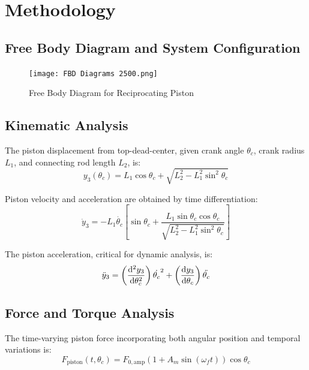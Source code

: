 \documentclass[10pt]{article}
\begin{document}
\section{Methodology}

\subsection{Free Body Diagram and System Configuration}

\begin{figure}[H]
    \centering
    \texttt{[image: FBD Diagrams 2500.png]}
    \caption{Free Body Diagram for Reciprocating Piston}
\end{figure}

\subsection{Kinematic Analysis}

The piston displacement from top-dead-center, given crank angle \(\theta_c\), crank radius \(L_1\), and connecting rod length \(L_2\), is:
\begin{equation}
    y_3(\theta_c) = L_1 \cos\theta_c + \sqrt{L_2^2 - L_1^2 \sin^2\theta_c}
\end{equation}

Piston velocity and acceleration are obtained by time differentiation:
\begin{equation}
    \dot{y}_3 = -L_1 \dot{\theta_c} \left[ \sin\theta_c + \frac{L_1 \sin\theta_c \cos\theta_c}{\sqrt{L_2^2 - L_1^2 \sin^2\theta_c}} \right]
\end{equation}

The piston acceleration, critical for dynamic analysis, is:
\begin{equation}
    \ddot{y}_3 = \left( \dv[2]{y_3}{\theta_c} \right) \dot{\theta_c}^2 + \left( \dv{y_3}{\theta_c} \right) \ddot{\theta_c}
\end{equation}

\subsection{Force and Torque Analysis}

The time-varying piston force incorporating both angular position and temporal variations is:
\begin{equation}
    F_{\text{piston}}(t, \theta_c) = F_{0,\text{amp}} (1 + A_m \sin(\omega_f t)) \cos\theta_c
\end{equation}
\end{document}
